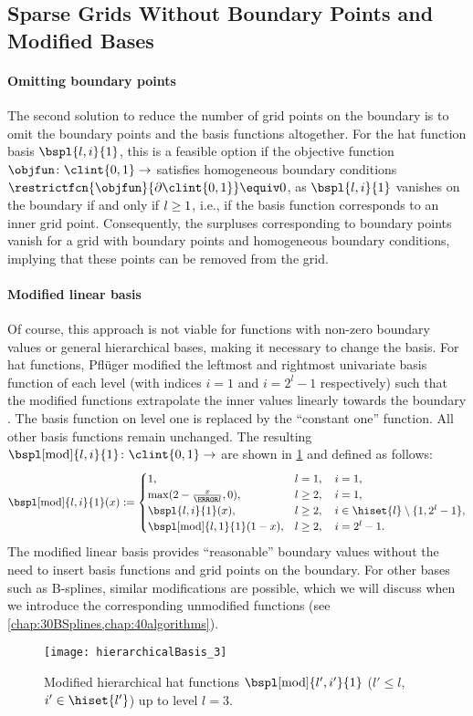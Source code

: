 \subsection{Sparse Grids Without Boundary Points and Modified Bases}
\label{sec:242modified}

\paragraph{Omitting boundary points}

The second solution to reduce the number of grid points on the boundary
is to omit the boundary points and the basis functions altogether.
For the hat function basis $\bspl{\*l,\*i}{1}$,
this is a feasible option if the objective
function $\objfun\colon \clint{\*0, \*1} \to \real$
satisfies homogeneous boundary conditions
$\restrictfcn{\objfun}{\bndrydomain{\clint{\*0, \*1}}} \equiv 0$,
as $\bspl{\*l,\*i}{1}$ vanishes on the boundary if and only if
$\*l \ge \*1$, i.e., if the basis function corresponds to an inner grid point.
Consequently, the surpluses corresponding to boundary points vanish
for a grid with boundary points and homogeneous boundary conditions,
implying that these points can be removed from the grid.

\paragraph{Modified linear basis}

Of course, this approach is not viable for functions with non-zero
boundary values or general hierarchical bases,
making it necessary to change the basis.
For hat functions, Pflüger modified the leftmost and rightmost
univariate basis function of each level (with indices $i = 1$ and
$i = 2^l - 1$ respectively) such that the modified functions
extrapolate the inner values linearly towards the boundary
\cite{Pflueger10Spatially}.
The basis function on level one is replaced by the
``constant one'' function.
All other basis functions remain unchanged.
The resulting 
$\bspl[\modified]{l,i}{1}\colon \clint{0, 1} \to \real$
are shown in \cref{fig:modifiedHat} and defined as follows:
\begin{equation}
  \bspl[\modified]{l,i}{1}(x)
  :=
  \begin{cases}
    1,&
    l = 1,\quad i = 1,\\
    \max(2 - \tfrac{x}{\ms{l}}, 0),&
    l \ge 2,\quad i = 1,\\
    \bspl{l,i}{1}(x),&
    l \ge 2,\quad i \in \hiset{l} \setminus \{1, 2^l - 1\},\\
    \bspl[\modified]{l,1}{1}(1 - x),&
    l \ge 2,\quad i = 2^l - 1.
  \end{cases}
\end{equation}
The modified linear basis provides ``reasonable'' boundary values
without the need to insert basis functions and grid points on the boundary.
For other bases such as B-splines, similar modifications are possible,
which we will discuss when we introduce the corresponding unmodified functions
(see \cref{chap:30BSplines,chap:40algorithms}).

\begin{SCfigure}
  \texttt{[image: hierarchicalBasis\_3]}%
  \caption[%
    Modified hierarchical hat functions%
  ]{%
    Modified hierarchical hat functions $\bspl[\modified]{l',i'}{1}$
    ($l' \le l$, $i' \in \hiset{l'}$) up to level $l = 3$.%
  }%
  \label{fig:modifiedHat}%
\end{SCfigure}
